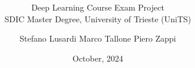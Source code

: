 \documentclass{settings/laserbeam}
\title{
	\bft{Multi-Model Approach for Brain Tumor Classification and Segmentation}
}
\subtitle{\small{
	Deep Learning Course Exam Project\\
	SDIC Master Degree, University of Trieste (UniTS)
}}
\date{October, 2024}
\author{Stefano Lusardi \hspace{1cm} Marco Tallone \hspace{1cm} Piero Zappi}
\begin{document}
\frame{\titlepage} %
\end{document}
